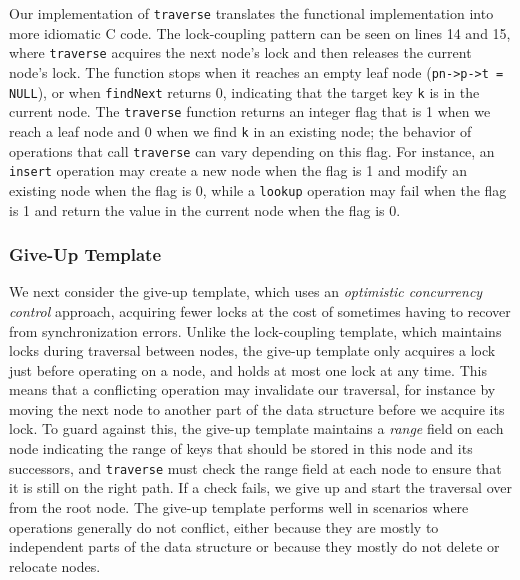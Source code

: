 \documentclass[a4paper,UKenglish,cleveref, autoref, thm-restate]{lipics-v2021}
\begin{document}
Our implementation of \lstinline{traverse} translates the functional implementation into more idiomatic C code. The lock-coupling pattern can be seen on lines 14 and 15, where \lstinline{traverse} acquires the next node's lock and then releases the current node's lock. The function stops when it reaches an empty leaf node (\lstinline{pn->p->t = NULL}), or when \lstinline{findNext} returns 0, indicating that the target key \lstinline{k} is in the current node. The \lstinline{traverse} function returns an integer flag that is 1 when we reach a leaf node and 0 when we find \lstinline{k} in an existing node; the behavior of operations that call \lstinline{traverse} can vary depending on this flag. For instance, an \lstinline{insert} operation may create a new node when the flag is 1 and modify an existing node when the flag is 0, while a \lstinline{lookup} operation may fail when the flag is 1 and return the value in the current node when the flag is 0.


\subsubsection{Give-Up Template}
\label{give-up-algo}

We next consider the give-up template, which uses an \emph{optimistic concurrency control} approach, acquiring fewer locks at the cost of sometimes having to recover from synchronization errors. Unlike the lock-coupling template, which maintains locks during traversal between nodes, the give-up template only acquires a lock just before operating on a node, and holds at most one lock at any time. This means that a conflicting operation may invalidate our traversal, for instance by moving the next node to another part of the data structure before we acquire its lock. To guard against this, the give-up template maintains a \emph{range} field on each node indicating the range of keys that should be stored in this node and its successors, and \lstinline{traverse} must check the range field at each node to ensure that it is still on the right path. If a check fails, we give up and start the traversal over from the root node. The give-up template performs well in scenarios where operations generally do not conflict, either because they are mostly to independent parts of the data structure or because they mostly do not delete or relocate nodes.
\end{document}
